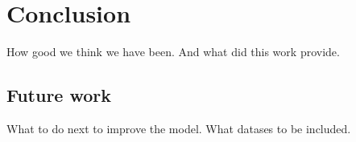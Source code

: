\chapter{Conclusion}

How good we think we have been. And what did this work provide.

\section{Future work}

What to do next to improve the model. What datases to be included.